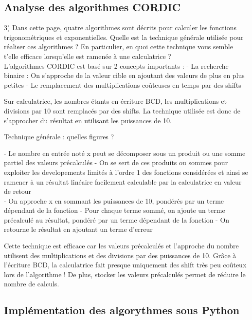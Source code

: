 \documentclass{article}
\begin{document}
\subsection*{Analyse des algorithmes CORDIC}

3) Dans cette page, quatre algorithmes sont décrits pour calculer les fonctions trigonométriques et exponentielles. Quelle est la technique générale utilisée pour réaliser ces algorithmes ? En particulier, en quoi cette technique vous semble t’elle efficace lorsqu’elle est ramenée à une calculatrice ?\\

L'algorithmes CORDIC est basé sur 2 concepts importants :
- La recherche binaire : On s'approche de la valeur cible en ajoutant des valeurs de plus en plus petites
- Le remplacement des multiplications coûteuses en temps par des shifts

Sur calculatrice, les nombres étants en écriture BCD, les multiplications et divisions par 10 sont remplacés par des shifts. La technique utilisée est donc de s'approcher du résultat en utilisant les puissances de 10.

Technique générale : quelles figures ?

- Le nombre en entrée noté x peut se décomposer sous un produit ou une somme partiel des valeurs précalculés
- On se sert de ces produits ou sommes pour exploiter les developements  limités à l'ordre 1 des fonctions considérées et ainsi se ramener à un résultat linéaire facilement calculable par la calculatrice en valeur de retour  \\ 
- On approche x en sommant les puissances de 10, pondérés par un terme dépendant de la fonction
- Pour chaque terme sommé, on ajoute un terme précalculé au résultat, pondéré par un terme dépendant de la fonction
- On retourne le résultat en ajoutant un terme d'erreur



Cette technique est efficace car les valeurs précalculés et l'approche du nombre utilisent des multiplications et des divisions par des puissances de 10. Grâce à l'écriture BCD, la calculatrice fait presque uniquement des shift très peu coûteux lors de l'algorithme ! De plus, stocker les valeurs précalculés permet de réduire le nombre de calculs. \\


\subsection*{Implémentation des algorythmes sous Python}
\end{document}
